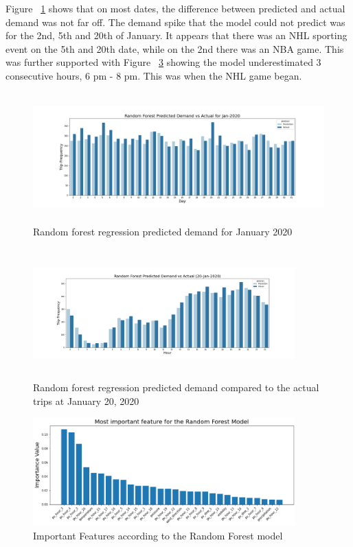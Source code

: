 \documentclass[11pt]{article}
\begin{document}
Figure ~\ref{fig:rf_hour_pred_act_jan_2020} shows that on most dates, the difference between predicted and actual demand was not far off. The demand spike that the model could not predict was for the 2nd, 5th and 20th of January. It appears that there was an NHL sporting event on the 5th and 20th date, while on the 2nd there was an NBA game. This was further supported with Figure ~\ref{fig:rf_hour_pred_act_20220127} showing the model underestimated 3 consecutive hours, 6 pm - 8 pm. This was when the NHL game began. 

\begin{figure}[h]
    \includegraphics[width=1.0\textwidth,height=5cm]{plots/rf_hour_pred_act_jan_2020.png}
    \centering
    \caption{Random forest regression predicted demand for January 2020} 
    \label{fig:rf_hour_pred_act_jan_2020}
\end{figure}
\begin{figure}[h]
    \includegraphics[width=0.9\textwidth,height=5cm]{plots/rf_hour_pred_act_20220120.png}
    \centering
    \caption{Random forest regression predicted demand compared to the actual trips at January 20, 2020} 
    \label{fig:rf_hour_pred_act_20220127}
\end{figure}
\begin{figure}[h]
    \includegraphics[width=0.9\textwidth]{plots/rf_important_feat.png}
    \centering
    \caption{Important Features according to the Random Forest model} 
    \label{fig:rf_hour_pred_act_20220127}
\end{figure}
\end{document}
